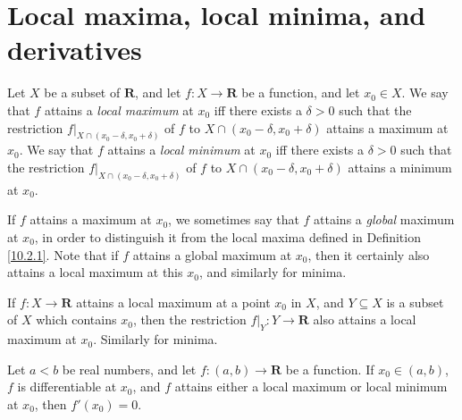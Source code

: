 \section{Local maxima, local minima, and derivatives}\label{sec 10.2}

\begin{definition}\label{10.2.1}
    Let \(X\) be a subset of \(\mathbf{R}\), and let \(f : X \to \mathbf{R}\) be a function, and let \(x_0 \in X\).
    We say that \(f\) attains a \emph{local maximum} at \(x_0\) iff there exists a \(\delta > 0\) such that the restriction \(f|_{X \cap (x_0 - \delta, x_0 + \delta)}\) of \(f\) to \(X \cap (x_0 - \delta, x_0 + \delta)\) attains a maximum at \(x_0\).
    We say that \(f\) attains a \emph{local minimum} at \(x_0\) iff there exists a \(\delta > 0\) such that the restriction \(f|_{X \cap (x_0 - \delta, x_0 + \delta)}\) of \(f\) to \(X \cap (x_0 - \delta, x_0 + \delta)\) attains a minimum at \(x_0\).
\end{definition}

\begin{remark}\label{10.2.2}
    If \(f\) attains a maximum at \(x_0\), we sometimes say that \(f\) attains a \emph{global} maximum at \(x_0\), in order to distinguish it from the local maxima defined in Definition \ref{10.2.1}.
    Note that if \(f\) attains a global maximum at \(x_0\), then it certainly also attains a local maximum at this \(x_0\), and similarly for minima.
\end{remark}

\setcounter{theorem}{4}
\begin{remark}\label{10.2.5}
    If \(f : X \to \mathbf{R}\) attains a local maximum at a point \(x_0\) in \(X\), and \(Y \subseteq X\) is a subset of \(X\) which contains \(x_0\), then the restriction \(f|_Y : Y \to \mathbf{R}\) also attains a local maximum at \(x_0\).
    Similarly for minima.
\end{remark}

\begin{proposition}\label{10.2.6}
    Let \(a < b\) be real numbers, and let \(f : (a, b) \to \mathbf{R}\) be a function.
    If \(x_0 \in (a, b)\), \(f\) is differentiable at \(x_0\), and \(f\) attains either a local maximum or local minimum at \(x_0\), then \(f'(x_0) = 0\).
\end{proposition}

